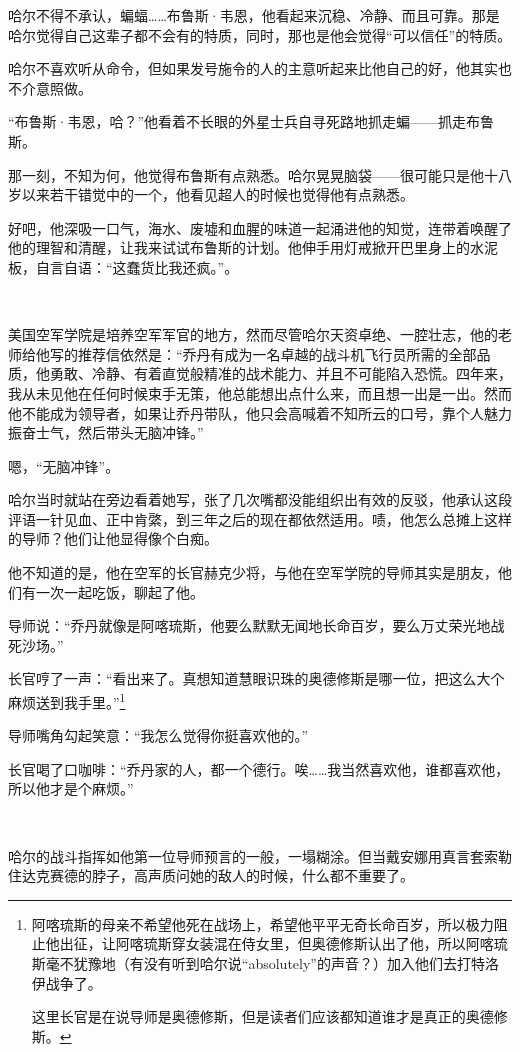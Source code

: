 \documentclass[../main]{subfiles}
\begin{document}
哈尔不得不承认，蝙蝠……布鲁斯·韦恩，他看起来沉稳、冷静、而且可靠。那是哈尔觉得自己这辈子都不会有的特质，同时，那也是他会觉得“可以信任”的特质。

哈尔不喜欢听从命令，但如果发号施令的人的主意听起来比他自己的好，他其实也不介意照做。

“布鲁斯·韦恩，哈？”他看着不长眼的外星士兵自寻死路地抓走蝙——抓走布鲁斯。

那一刻，不知为何，他觉得布鲁斯有点熟悉。哈尔晃晃脑袋——很可能只是他十八岁以来若干错觉中的一个，他看见超人的时候也觉得他有点熟悉。

好吧，他深吸一口气，海水、废墟和血腥的味道一起涌进他的知觉，连带着唤醒了他的理智和清醒，让我来试试布鲁斯的计划。他伸手用灯戒掀开巴里身上的水泥板，自言自语：“这蠢货比我还疯。”。

~\

美国空军学院是培养空军军官的地方，然而尽管哈尔天资卓绝、一腔壮志，他的老师给他写的推荐信依然是：“乔丹有成为一名卓越的战斗机飞行员所需的全部品质，他勇敢、冷静、有着直觉般精准的战术能力、并且不可能陷入恐慌。四年来，我从未见他在任何时候束手无策，他总能想出点什么来，而且想一出是一出。然而他不能成为领导者，如果让乔丹带队，他只会高喊着不知所云的口号，靠个人魅力振奋士气，然后带头无脑冲锋。”

嗯，“无脑冲锋”。

哈尔当时就站在旁边看着她写，张了几次嘴都没能组织出有效的反驳，他承认这段评语一针见血、正中肯綮，到三年之后的现在都依然适用。啧，他怎么总摊上这样的导师？他们让他显得像个白痴。

他不知道的是，他在空军的长官赫克少将，与他在空军学院的导师其实是朋友，他们有一次一起吃饭，聊起了他。

导师说：“乔丹就像是阿喀琉斯，他要么默默无闻地长命百岁，要么万丈荣光地战死沙场。”

长官哼了一声：“看出来了。真想知道慧眼识珠的奥德修斯是哪一位，把这么大个麻烦送到我手里。”\footnote[1]{ 阿喀琉斯的母亲不希望他死在战场上，希望他平平无奇长命百岁，所以极力阻止他出征，让阿喀琉斯穿女装混在侍女里，但奥德修斯认出了他，所以阿喀琉斯毫不犹豫地（有没有听到哈尔说“absolutely”的声音？）加入他们去打特洛伊战争了。

    这里长官是在说导师是奥德修斯，但是读者们应该都知道谁才是真正的奥德修斯。}

导师嘴角勾起笑意：“我怎么觉得你挺喜欢他的。”

长官喝了口咖啡：“乔丹家的人，都一个德行。唉……我当然喜欢他，谁都喜欢他，所以他才是个麻烦。”

~\

哈尔的战斗指挥如他第一位导师预言的一般，一塌糊涂。但当戴安娜用真言套索勒住达克赛德的脖子，高声质问她的敌人的时候，什么都不重要了。
\end{document}
